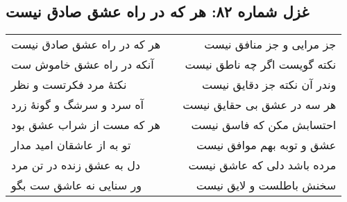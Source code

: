 \begin{center}
\section*{غزل شماره ۸۲: هر که در راه عشق صادق نیست}
\label{sec:082}
\begin{longtable}{l p{0.5cm} r}
هر که در راه عشق صادق نیست
&&
جز مرایی و جز منافق نیست
\\
آنکه در راه عشق خاموش ست
&&
نکته گویست اگر چه ناطق نیست
\\
نکتهٔ مرد فکرتست و نظر
&&
وندر آن نکته جز دقایق نیست
\\
آه سرد و سرشگ و گونهٔ زرد
&&
هر سه در عشق بی حقایق نیست
\\
هر که مست از شراب عشق بود
&&
احتسابش مکن که فاسق نیست
\\
تو به از عاشقان امید مدار
&&
عشق و توبه بهم موافق نیست
\\
دل به عشق زنده در تن مرد
&&
مرده باشد دلی که عاشق نیست
\\
ور سنایی نه عاشق ست بگو
&&
سخنش باطلست و لایق نیست
\\
\end{longtable}
\end{center}
